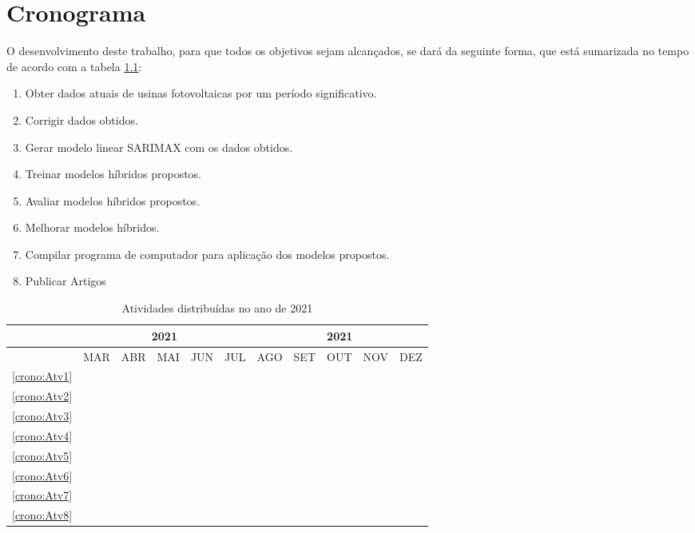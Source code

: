 \chapter{Cronograma}
\label{cap:cronograma}

O desenvolvimento deste trabalho, para que todos os objetivos sejam alcançados, se dará da seguinte forma, que está sumarizada no tempo de acordo com a tabela \ref{tab:cronograma}:

\begin{enumerate}
	\item \label{crono:Atv1} Obter dados atuais de usinas fotovoltaicas por um período significativo.
	\item \label{crono:Atv2} Corrigir dados obtidos.
	\item \label{crono:Atv3} Gerar modelo linear SARIMAX com os dados obtidos.
	\item \label{crono:Atv4} Treinar modelos híbridos propostos. 
	\item \label{crono:Atv5} Avaliar modelos híbridos propostos.
	\item \label{crono:Atv6} Melhorar modelos híbridos.
	\item \label{crono:Atv7} Compilar programa de computador para aplicação dos modelos propostos. \item \label{crono:Atv8} Publicar Artigos
\end{enumerate}

\begin{table}[h]
\caption{Atividades distribuídas no ano de 2021} 
\label{tab:cronograma}
\centering
	\begin{tabular}{|c|c|c|c|c|c|c|c|c|c|c|}
		\hline
		&\multicolumn{5}{c|}{2021}&\multicolumn{5}{c|}{2021}\\
		\hline
		&MAR&ABR&MAI&JUN&JUL&AGO&SET&OUT&NOV&DEZ\\
		\hline
		\ref{crono:Atv1}&\cellcolor{midgray}&\cellcolor{midgray}&&&&&&&&\\
		\hline
		\ref{crono:Atv2}&&&\cellcolor{midgray}&\cellcolor{midgray}&&&&&&\\
		\hline	
		\ref{crono:Atv3}&&&\cellcolor{midgray}&\cellcolor{midgray}&&&&&&\\
		\hline			
		\ref{crono:Atv4}&&&&\cellcolor{midgray}&\cellcolor{midgray}&&&&\\
		\hline	
		\ref{crono:Atv5}&&&&\cellcolor{midgray}&\cellcolor{midgray}&&&&&\\
		\hline
		\ref{crono:Atv6}&&&&&\cellcolor{midgray}&\cellcolor{midgray}&&&&\\
		\hline	
		\ref{crono:Atv7}&&&&&&&\cellcolor{midgray}&\cellcolor{midgray}&&\\
		\hline
		\ref{crono:Atv8}&&&&&&&&&\cellcolor{midgray}&\cellcolor{midgray}\\
		\hline
	\end{tabular}
\end{table}